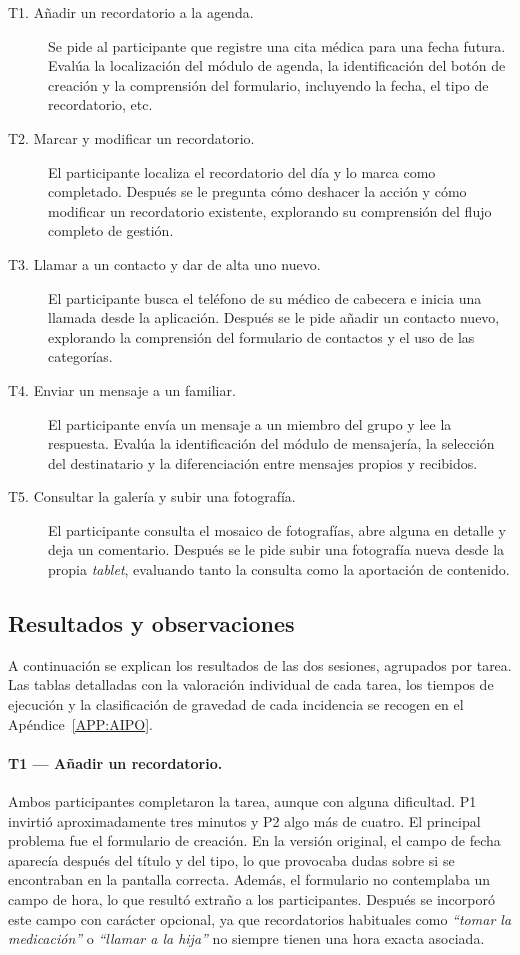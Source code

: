 \begin{description}
\item[T1. Añadir un recordatorio a la agenda.]
Se pide al participante que registre una cita médica para una fecha
futura. Evalúa la localización del módulo de agenda, la identificación del
botón de creación y la comprensión del formulario, incluyendo la fecha, el
tipo de recordatorio, etc.

\item[T2. Marcar y modificar un recordatorio.]
El participante localiza el recordatorio del día y lo marca como
completado. Después se le pregunta cómo deshacer la acción y cómo modificar
un recordatorio existente, explorando su comprensión del flujo completo de
gestión.

\item[T3. Llamar a un contacto y dar de alta uno nuevo.]
El participante busca el teléfono de su médico de cabecera e inicia una
llamada desde la aplicación. Después se le pide añadir un contacto nuevo,
explorando la comprensión del formulario de contactos y el uso de las
categorías.

\item[T4. Enviar un mensaje a un familiar.]
El participante envía un mensaje a un miembro del grupo y lee la respuesta.
Evalúa la identificación del módulo de mensajería, la selección del
destinatario y la diferenciación entre mensajes propios y recibidos.

\item[T5. Consultar la galería y subir una fotografía.]
El participante consulta el mosaico de fotografías, abre alguna en detalle
y deja un comentario. Después se le pide subir una fotografía nueva desde
la propia \emph{tablet}, evaluando tanto la consulta como la aportación de
contenido.
\end{description}

\subsection{Resultados y observaciones\label{SUB:AIPO_RESULTADOS}}

A continuación se explican los resultados de las dos sesiones, agrupados
por tarea. Las tablas detalladas con la valoración individual de cada
tarea, los tiempos de ejecución y la clasificación de gravedad de cada
incidencia se recogen en el Apéndice~\ref{APP:AIPO}.

\paragraph{T1 — Añadir un recordatorio.}
Ambos participantes completaron la tarea, aunque con alguna dificultad.
P1 invirtió aproximadamente tres minutos y P2 algo más de cuatro. El
principal problema fue el formulario de creación. En la versión original,
el campo de fecha aparecía después del título y del tipo, lo que provocaba
dudas sobre si se encontraban en la pantalla correcta. Además, el
formulario no contemplaba un campo de hora, lo que resultó extraño a los
participantes. Después se incorporó este campo con carácter opcional, ya
que recordatorios habituales como \emph{``tomar la medicación''} o
\emph{``llamar a la hija''} no siempre tienen una hora exacta asociada.


